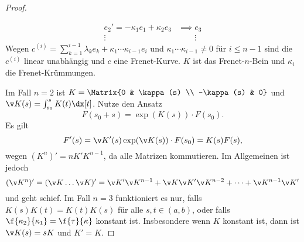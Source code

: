 \begin{st}
\begin{proof}
\begin{enumerate}[1.]
\begin{align*}
					e_2' = -\kappa_1 e_1 + \kappa_2 e_3 &\implies e_3 \\
					\vdots &\qquad \vdots
				\end{align*}
				Wegen $c^{(i)} = \sum_{k=1}^{i-1} \lambda_k e_k + \kappa_1 \dotsb \kappa_{i-1} e_i$ und $\kappa_1 \dotsb \kappa_{i-1} \neq 0$ für $i \le n-1$ sind die $c^{(i)}$ linear unabhängig und $c$ eine Frenet-Kurve.
				$K$ ist das Frenet-$n$-Bein und $\kappa_i$ die Frenet-Krümmungen.
		\end{enumerate}
		Im Fall $n=2$ ist $K= \Matrix{0 & \kappa(s) \\ -\kappa(s) & 0}$ und $\v K(s) = \int_{s_0}^s K(t) \dx[t]$.
		Nutze den Ansatz
		\[
			F(s_0 + s) = \exp (K(s)) \cdot F(s_0).
		\]
		Es gilt
		\[
			F'(s)
			= \v K'(s) \exp(\v K(s)) \cdot F(s_0)
			= K(s) F(s),
		\]
		wegen $(K^n)' = n K' K^{n-1}$, da alle Matrizen kommutieren.
		Im Allgemeinen ist jedoch
		\[
			(\v K^n)'
			= (\v K \dotsc \v K)'
			= \v K' \v K^{n-1} + \v K \v K' \v K^{n-2} + \dotsb + \v K^{n-1} \v K'
		\]
		und geht schief.
		Im Fall $n=3$ funktioniert es nur, falls $K(s) K(t) = K(t) K(s)$ für alle $s, t \in (a,b)$, oder falls $\f {\kappa_2}{\kappa_1} = \f {\tau}{\kappa}$ konstant ist.
		Insbesondere wenn $K$ konstant ist, dann ist $\v K(s) = sK$ und $K' = K$.
	\end{proof}
\end{st}






